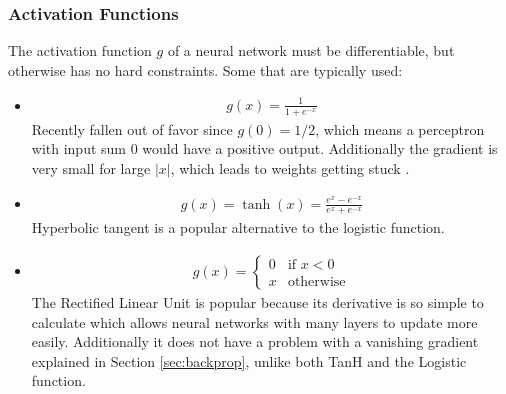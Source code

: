 \subsubsection{Activation Functions}
The activation function $g$ of a neural network must be differentiable, but otherwise has no hard constraints. Some that are typically used:
\begin{itemize}
    \item {}
\begin{align}
	g(x) = \frac{1}{1+e^{-x}}
\end{align}
Recently fallen out of favor since $g(0)=1/2$, which means a perceptron with input sum $0$ would have a positive output. Additionally the gradient is very small for large $|x|$, which leads to weights getting stuck \cite{grus}.
    \item {}
\begin{align}
    g(x) = \tanh (x) = \frac{e^x-e^{-x}}{e^x+e^{-x}}
\end{align}
    Hyperbolic tangent is a popular alternative to the logistic function.
    \item {}
    \begin{align}
     g(x)= 
\begin{cases}
    0 & \text{if } x <  0\\
    x & \text{otherwise}
\end{cases}
\end{align}
The Rectified Linear Unit is popular because its derivative is so simple to calculate which allows neural networks with many layers to update more easily. Additionally it does not have a problem with a vanishing gradient explained in Section \ref{sec:backprop}, unlike both TanH and the Logistic function.
\end{itemize}

